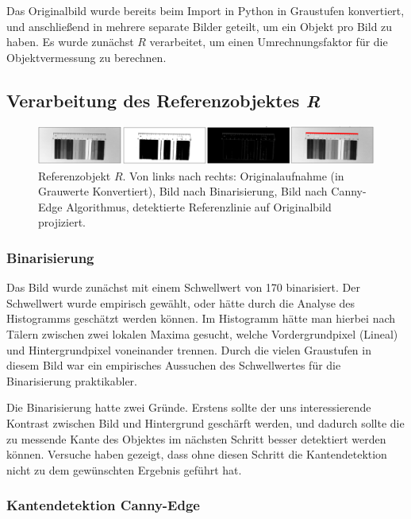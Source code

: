 \documentclass{article}
\begin{document}
Das Originalbild wurde bereits beim Import in Python in Graustufen konvertiert, und anschließend in mehrere separate Bilder geteilt, um ein Objekt pro Bild zu haben. Es wurde zunächst $R$ verarbeitet, um einen Umrechnungsfaktor für die Objektvermessung zu berechnen.

\subsection{Verarbeitung des Referenzobjektes \emph{R}}

\begin{figure}
    \centering
    \includegraphics[width=4.5in]{FigRef.png}
    \caption{Referenzobjekt $R$. Von links nach rechts: Originalaufnahme (in Grauwerte Konvertiert), Bild nach Binarisierung, Bild nach Canny-Edge Algorithmus, detektierte Referenzlinie auf Originalbild projiziert.}
    \label{fig:fig1}
\end{figure}

\subsubsection{Binarisierung}

Das Bild wurde zunächst mit einem Schwellwert von 170 binarisiert. Der Schwellwert wurde empirisch gewählt, oder hätte durch die Analyse des Histogramms geschätzt werden können. Im Histogramm hätte man hierbei nach Tälern zwischen zwei lokalen Maxima gesucht, welche Vordergrundpixel (Lineal) und Hintergrundpixel voneinander trennen. Durch die vielen Graustufen in diesem Bild war ein empirisches Aussuchen des Schwellwertes für die Binarisierung praktikabler.

Die Binarisierung hatte zwei Gründe. Erstens sollte der uns interessierende Kontrast zwischen Bild und Hintergrund geschärft werden, und dadurch sollte die zu messende Kante des Objektes im nächsten Schritt besser detektiert werden können. Versuche haben gezeigt, dass ohne diesen Schritt die Kantendetektion nicht zu dem gewünschten Ergebnis geführt hat.

\subsubsection{Kantendetektion \/ Canny-Edge}
\end{document}
